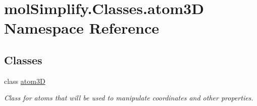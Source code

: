 \hypertarget{namespacemolSimplify_1_1Classes_1_1atom3D}{}\section{mol\+Simplify.\+Classes.\+atom3D Namespace Reference}
\label{namespacemolSimplify_1_1Classes_1_1atom3D}
\subsection*{Classes}
\begin{DoxyCompactItemize}
\item 
class \hyperlink{classmolSimplify_1_1Classes_1_1atom3D_1_1atom3D}{atom3D}
\begin{DoxyCompactList}\small\item\em Class for atoms that will be used to manipulate coordinates and other properties. \end{DoxyCompactList}\end{DoxyCompactItemize}
